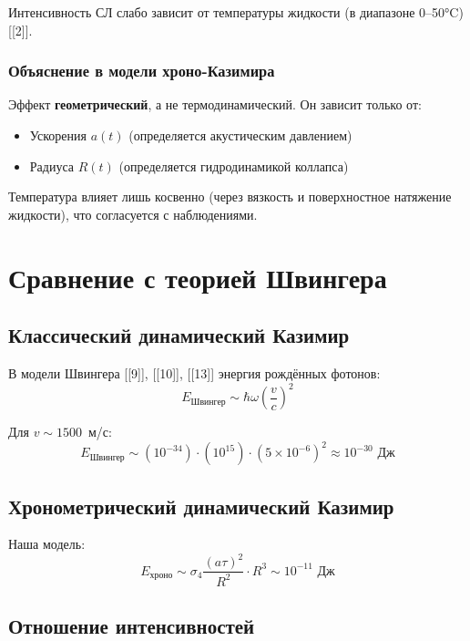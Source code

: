 \documentclass[12pt,a4paper]{article}
\begin{document}
Интенсивность СЛ слабо зависит от температуры жидкости (в диапазоне 0--50°C) [[2]].

\subsubsection{Объяснение в модели хроно-Казимира}

Эффект \textbf{геометрический}, а не термодинамический. Он зависит только от:
\begin{itemize}
    \item Ускорения $a(t)$ (определяется акустическим давлением)
    \item Радиуса $R(t)$ (определяется гидродинамикой коллапса)
\end{itemize}

Температура влияет лишь косвенно (через вязкость и поверхностное натяжение жидкости), что согласуется с наблюдениями.

\section{Сравнение с теорией Швингера}
\label{sec:comparison}

\subsection{Классический динамический Казимир}

В модели Швингера [[9]], [[10]], [[13]] энергия рождённых фотонов:
\begin{equation}
E_{\text{Швингер}} \sim \hbar\omega \left(\frac{v}{c}\right)^2
\end{equation}

Для $v \sim 1500$~м/с:
\begin{equation}
E_{\text{Швингер}} \sim (10^{-34}) \cdot (10^{15}) \cdot (5 \times 10^{-6})^2 \approx 10^{-30} \text{ Дж}
\end{equation}

\subsection{Хронометрический динамический Казимир}

Наша модель:
\begin{equation}
E_{\text{хроно}} \sim \sigma_4 \frac{(a\tau)^2}{R^2} \cdot R^3 \sim 10^{-11} \text{ Дж}
\end{equation}

\subsection{Отношение интенсивностей}
\end{document}
